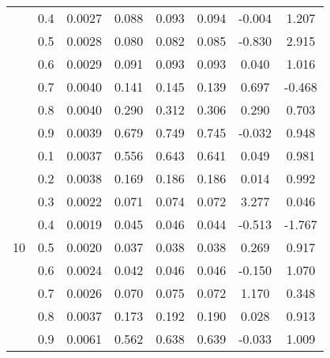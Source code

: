 \documentclass[11pt,a4paper]{report}
\begin{document}
\begin{longtable}{ | c | c || c | c | c | c | c | c | }
 & 0.4 & 0.0027 & 0.088 & 0.093 & 0.094 & -0.004 & 1.207 \\
 & 0.5 & 0.0028 & 0.080 & 0.082 & 0.085 & -0.830 & 2.915 \\
 & 0.6 & 0.0029 & 0.091 & 0.093 & 0.093 & 0.040 & 1.016 \\
 & 0.7 & 0.0040 & 0.141 & 0.145 & 0.139 & 0.697 & -0.468 \\
 & 0.8 & 0.0040 & 0.290 & 0.312 & 0.306 & 0.290 & 0.703 \\
 & 0.9 & 0.0039 & 0.679 & 0.749 & 0.745 & -0.032 & 0.948 \\
 \hline
\multirow{9}{*}{10} & 0.1 & 0.0037 & 0.556 & 0.643 & 0.641 & 0.049 & 0.981 \\
 & 0.2 & 0.0038 & 0.169 & 0.186 & 0.186 & 0.014 & 0.992 \\
 & 0.3 & 0.0022 & 0.071 & 0.074 & 0.072 & 3.277 & 0.046 \\
 & 0.4 & 0.0019 & 0.045 & 0.046 & 0.044 & -0.513 & -1.767 \\
 & 0.5 & 0.0020 & 0.037 & 0.038 & 0.038 & 0.269 & 0.917 \\
 & 0.6 & 0.0024 & 0.042 & 0.046 & 0.046 & -0.150 & 1.070 \\
 & 0.7 & 0.0026 & 0.070 & 0.075 & 0.072 & 1.170 & 0.348 \\
 & 0.8 & 0.0037 & 0.173 & 0.192 & 0.190 & 0.028 & 0.913 \\
 & 0.9 & 0.0061 & 0.562 & 0.638 & 0.639 & -0.033 & 1.009 \\
 \hline
\hline
\end{longtable}
\end{document}

